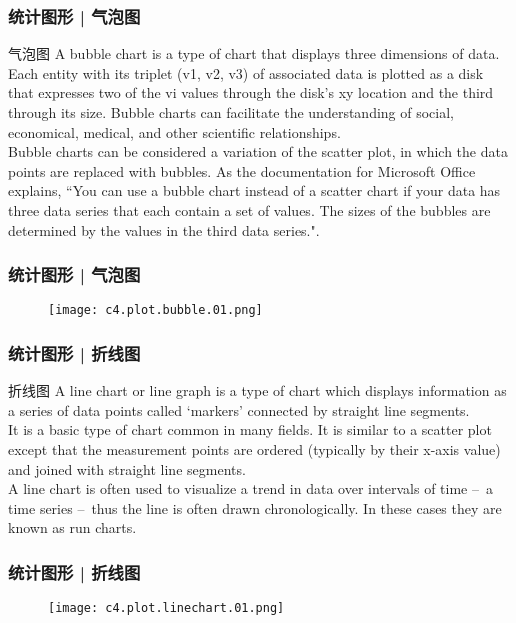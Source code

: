 \begin{frame}
  \frametitle{统计图形 | 气泡图}
  \begin{block}{气泡图}
    A bubble chart is a type of chart that displays three dimensions of data. Each entity with its triplet (v1, v2, v3) of associated data is plotted as a disk that expresses two of the vi values through the disk's xy location and the third through its size. Bubble charts can facilitate the understanding of social, economical, medical, and other scientific relationships.\\
    \vspace{0.5em}
Bubble charts can be considered a variation of the scatter plot, in which the data points are replaced with bubbles. As the documentation for Microsoft Office explains, ``You can use a bubble chart instead of a scatter chart if your data has three data series that each contain a set of values. The sizes of the bubbles are determined by the values in the third data series.".
  \end{block}
\end{frame}

\begin{frame}
  \frametitle{统计图形 | 气泡图}
  \begin{figure}
    \centering
    \texttt{[image: c4.plot.bubble.01.png]}
  \end{figure}
\end{frame}

\begin{frame}
  \frametitle{统计图形 | 折线图}
  \begin{block}{折线图}
    A line chart or line graph is a type of chart which displays information as a series of data points called `markers' connected by straight line segments.\\
    \vspace{0.5em}
    It is a basic type of chart common in many fields. It is similar to a scatter plot except that the measurement points are ordered (typically by their x-axis value) and joined with straight line segments.\\
    \vspace{0.5em}
    A line chart is often used to visualize a trend in data over intervals of time –\ a time series –\ thus the line is often drawn chronologically. In these cases they are known as run charts.
  \end{block}
\end{frame}

\begin{frame}
  \frametitle{统计图形 | 折线图}
  \begin{figure}
    \centering
    \texttt{[image: c4.plot.linechart.01.png]}
  \end{figure}
\end{frame}

